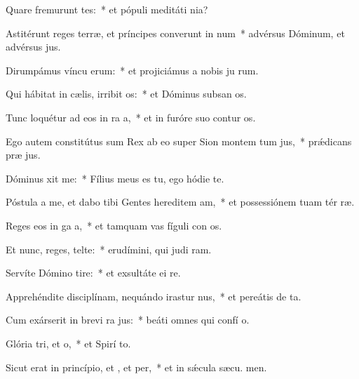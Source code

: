 \item Quare fremurunt tes:~* et pópuli meditáti  nia?
\item Astitérunt reges terræ, et príncipes converunt in num~* advérsus Dóminum, et advérsus  jus.
\item Dirumpámus víncu erum:~* et projiciámus a nobis ju rum.
\item Qui hábitat in cælis, irribit os:~* et Dóminus subsan os.
\item Tunc loquétur ad eos in ra a,~* et in furóre suo contur os.
\item Ego autem constitútus sum Rex ab eo super Sion montem tum jus,~* prǽdicans præ jus.
\item Dóminus xit  me:~* Fílius meus es tu, ego hódie  te.
\item Póstula a me, et dabo tibi Gentes hereditem am,~* et possessiónem tuam tér ræ.
\item Reges eos in ga a,~* et tamquam vas fíguli con os.
\item Et nunc, reges, telte:~* erudímini, qui judi ram.
\item Servíte Dómino  tire:~* et exsultáte ei  re.
\item Apprehéndite disciplínam, nequándo irastur nus,~* et pereátis de  ta.
\item Cum exárserit in brevi ra jus:~* beáti omnes qui confí  o.
\item Glória tri, et o,~* et Spirí to.
\item Sicut erat in princípio, et , et per,~* et in sǽcula sæcu. men.
